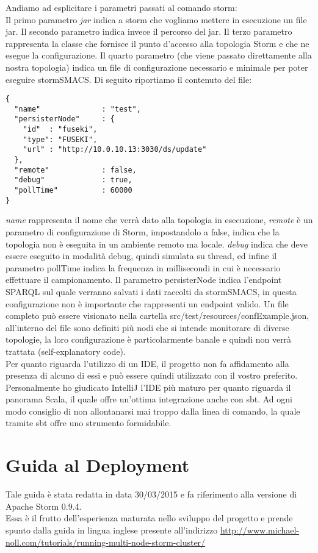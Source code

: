 \documentclass[12pt]{article}
\begin{document}
Andiamo ad esplicitare i parametri passati al comando storm:\\
Il primo parametro \emph{jar} indica a storm che vogliamo mettere in esecuzione un file jar.
Il secondo parametro indica invece il percorso del jar.
Il terzo parametro rappresenta la classe che fornisce il punto d'accesso alla topologia Storm e che ne esegue la configurazione.
Il quarto parametro (che viene passato direttamente alla nostra topologia) indica un file di configurazione necessario e minimale per poter eseguire stormSMACS. Di seguito riportiamo il contenuto del file:
\begin{lstlisting}
{
  "name"              : "test",
  "persisterNode"     : {
    "id"  : "fuseki",
    "type": "FUSEKI",
    "url" : "http://10.0.10.13:3030/ds/update"
  },
  "remote"            : false,
  "debug"             : true,
  "pollTime"          : 60000
}
\end{lstlisting}
\emph{name} rappresenta il nome che verr\`a dato alla topologia in esecuzione, \emph{remote} \`e un parametro di configurazione di Storm, impostandolo a false, indica che la topologia non \`e eseguita in un ambiente remoto ma locale.
\emph{debug} indica che deve essere eseguito in modalit\`a debug, quindi simulata su thread, ed infine il parametro pollTime indica la frequenza in millisecondi in cui \`e necessario effettuare il campionamento.
Il parametro persisterNode indica l'endpoint SPARQL sul quale verranno salvati i dati raccolti da stormSMACS, in questa configurazione non \`e importante che rappresenti un endpoint valido.
Un file completo pu\`o essere visionato nella cartella src/test/resources/confExample.json, all'interno del file sono definiti pi\`u nodi che si intende monitorare di diverse topologie, la loro configurazione \`e particolarmente banale e quindi non verr\`a trattata (self-explanatory code).\\
Per quanto riguarda l'utilizzo di un IDE, il progetto non fa affidamento alla presenza di alcuno di essi e pu\`o essere quindi utilizzato con il vostro preferito. Personalmente ho giudicato IntelliJ l'IDE pi\`u maturo per quanto riguarda il panorama Scala, il quale offre un'ottima integrazione anche con sbt. Ad ogni modo consiglio di non allontanarsi mai troppo dalla linea di comando, la quale tramite sbt offre uno strumento formidabile.
\section{Guida al Deployment}
Tale guida \`e stata redatta in data 30/03/2015 e fa riferimento alla versione di Apache Storm 0.9.4.\\
Essa \`e il frutto dell'esperienza maturata nello sviluppo del progetto e prende spunto dalla guida in lingua inglese presente all'indirizzo \url{http://www.michael-noll.com/tutorials/running-multi-node-storm-cluster/}\\
\end{document}
